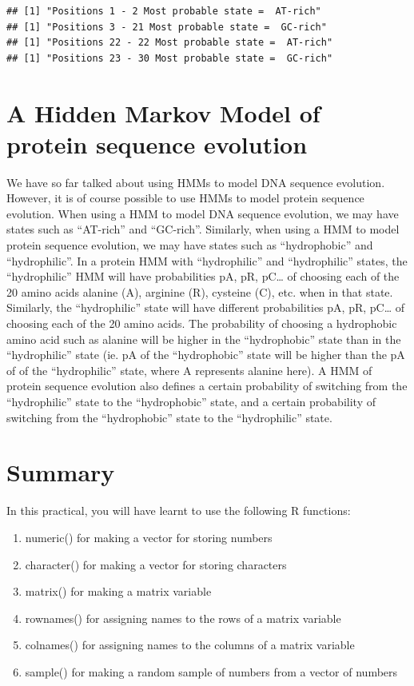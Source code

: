 \documentclass[
]{book}
\providecommand{\tightlist}{%
  \setlength{\itemsep}{0pt}\setlength{\parskip}{0pt}}
\begin{document}
\begin{verbatim}
## [1] "Positions 1 - 2 Most probable state =  AT-rich"
## [1] "Positions 3 - 21 Most probable state =  GC-rich"
## [1] "Positions 22 - 22 Most probable state =  AT-rich"
## [1] "Positions 23 - 30 Most probable state =  GC-rich"
\end{verbatim}

\hypertarget{a-hidden-markov-model-of-protein-sequence-evolution}{%
\section{A Hidden Markov Model of protein sequence evolution}\label{a-hidden-markov-model-of-protein-sequence-evolution}}

We have so far talked about using HMMs to model DNA sequence evolution. However, it is of course possible to use HMMs to model protein sequence evolution. When using a HMM to model DNA sequence evolution, we may have states such as ``AT-rich'' and ``GC-rich''. Similarly, when using a HMM to model protein sequence evolution, we may have states such as ``hydrophobic'' and ``hydrophilic''. In a protein HMM with ``hydrophilic'' and ``hydrophilic'' states, the ``hydrophilic'' HMM will have probabilities pA, pR, pC\ldots{} of choosing each of the 20 amino acids alanine (A), arginine (R), cysteine (C), etc. when in that state. Similarly, the ``hydrophilic'' state will have different probabilities pA, pR, pC\ldots{} of choosing each of the 20 amino acids. The probability of choosing a hydrophobic amino acid such as alanine will be higher in the ``hydrophobic'' state than in the ``hydrophilic'' state (ie. pA of the ``hydrophobic'' state will be higher than the pA of of the ``hydrophilic'' state, where A represents alanine here). A HMM of protein sequence evolution also defines a certain probability of switching from the ``hydrophilic'' state to the ``hydrophobic'' state, and a certain probability of switching from the ``hydrophobic'' state to the ``hydrophilic'' state.

\hypertarget{summary-7}{%
\section{Summary}\label{summary-7}}

In this practical, you will have learnt to use the following R functions:

\begin{enumerate}
\def\labelenumi{\arabic{enumi}.}
\tightlist
\item
  numeric() for making a vector for storing numbers
\item
  character() for making a vector for storing characters
\item
  matrix() for making a matrix variable
\item
  rownames() for assigning names to the rows of a matrix variable
\item
  colnames() for assigning names to the columns of a matrix variable
\item
  sample() for making a random sample of numbers from a vector of numbers
\end{enumerate}
\end{document}
